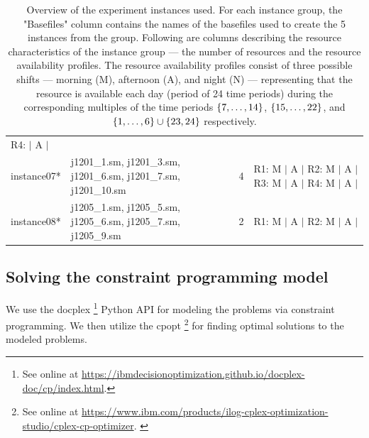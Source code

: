 \begin{table}[p]
\begin{tabularx}{0.88\textwidth}{lXcX}
                      R4: \phantom{M} $|$ A $|$
                    \\
                    \cmidrule[0.01em](lr){1-4}
        instance07* & j1201\_1.sm, j1201\_3.sm, j1201\_6.sm, j1201\_7.sm, j1201\_10.sm
                    & 4 
                    & R1: M $|$ A $|$ \newline
                      R2: M $|$ A $|$ \newline
                      R3: M $|$ A $|$ \newline
                      R4: M $|$ A $|$
                    \\
                    \cmidrule[0.01em](lr){1-4}
        instance08* & j1205\_1.sm, j1205\_5.sm, j1205\_6.sm, j1205\_7.sm, j1205\_9.sm
                    & 2 
                    & R1: M $|$ A $|$ \newline
                      R2: M $|$ A $|$
                    \\
        \bottomrule
    \end{tabularx}
    \caption{
        Overview of the experiment instances used.
        For each instance group,
        the "Basefiles" column contains the names of the basefiles used to create the 5 instances from the group.
        Following are columns describing the resource characteristics of the instance group ---
        the number of resources and the resource availability profiles.
        The resource availability profiles consist of three possible shifts ---
        morning (M), afternoon (A), and night (N) ---
        representing that the resource is available each day (period of 24 time periods)
        during the corresponding multiples of the time periods
        $\{{7}, \dots, {14}\}$, $\{{15}, \dots, {22}\}$, and $\{{1}, \dots, {6}\} \cup \{23, 24\}$ respectively.
        }
    \label{tab:instances}
\end{table}

\subsection{Solving the constraint programming model} \label{subsec:numerical-experiments/setup/solving-cp-model}

We use the \ac{docplex}%
\footnote{See online at \url{https://ibmdecisionoptimization.github.io/docplex-doc/cp/index.html}.}
Python API for modeling the problems via constraint programming.
We then utilize the \ac{cpopt}%
\footnote{See online at \url{https://www.ibm.com/products/ilog-cplex-optimization-studio/cplex-cp-optimizer}. \citep{WEB_IBM_CPLEX}}
for finding optimal solutions to the modeled problems.

